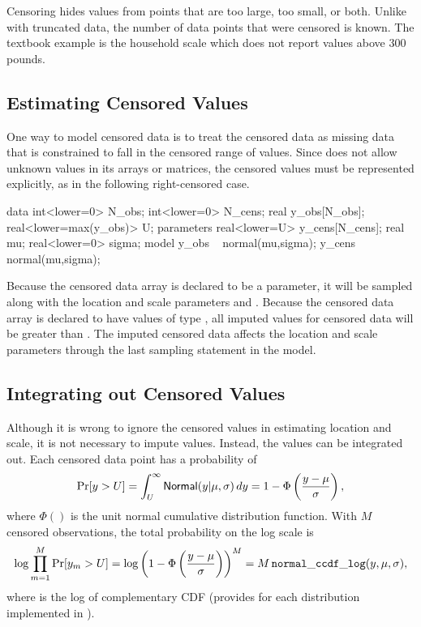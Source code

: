 Censoring hides values from points that are too large, too small, or
both.  Unlike with truncated data, the number of data points that were
censored is known.  The textbook example is the household scale which
does not report values above 300 pounds.  

\subsection{Estimating Censored Values}

One way to model censored data is to treat the censored data as
missing data that is constrained to fall in the censored range of
values.  Since \Stan does not allow unknown values in its arrays or
matrices, the censored values must be represented explicitly, as in the
following right-censored case.
%
\begin{stancode}
data {
  int<lower=0> N_obs;
  int<lower=0> N_cens;
  real y_obs[N_obs];
  real<lower=max(y_obs)> U;
}
parameters {
  real<lower=U> y_cens[N_cens];
  real mu;
  real<lower=0> sigma;
}
model {
  y_obs ~ normal(mu,sigma);
  y_cens ~ normal(mu,sigma);
}
\end{stancode}
%
Because the censored data array  is declared to be a parameter, it
will be sampled along with the location and scale parameters 
and .  Because the censored data array  is
declared to have values of type , all imputed values
for censored data will be greater than .  The imputed censored
data affects the location and scale parameters through the last
sampling statement in the model.  

\subsection{Integrating out Censored Values}

Although it is wrong to ignore the censored values in estimating
location and scale, it is not necessary to impute values.  Instead,
the values can be integrated out.  Each censored data point has a
probability of
%
\[
\mbox{Pr}[y > U] 
= \int_U^{\infty} \distro{Normal}(y|\mu,\sigma) \, dy
= 1 - \Phi\left(\frac{y - \mu}{\sigma}\right),
\]
%
where $\Phi()$ is the unit normal cumulative distribution function.
With $M$ censored observations, the total probability on the log scale
is
\[
\log \prod_{m=1}^M \mbox{Pr}[y_m > U]
= \log \left( 1 - \Phi\left(\frac{y - \mu}{\sigma}\right)\right)^{M}
= M \, \code{normal\_ccdf\_log}(y,\mu,\sigma),
\]
%
where  is the log of complementary CDF
(\Stan provides  for each distribution
implemented in \Stan).


